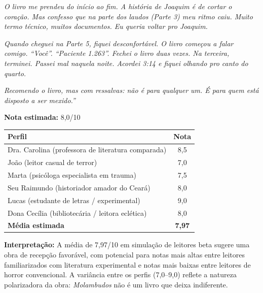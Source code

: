 \documentclass[14pt,openany]{extbook}
\newcommand{\ornamento}{\begin{center}\pgfornament[width=3.6cm,color=customgold]{85}\end{center}}
\begin{document}
\vspace{0.3em}
\noindent\textit{O livro me prendeu do início ao fim. A história de Joaquim é de cortar o coração. Mas confesso que na parte dos laudos (Parte 3) meu ritmo caiu. Muito termo técnico, muitos documentos. Eu queria voltar pro Joaquim.}

\vspace{0.3em}
\noindent\textit{Quando cheguei na Parte 5, fiquei desconfortável. O livro começou a falar comigo. ``Você''. ``Paciente 1.263''. Fechei o livro duas vezes. Na terceira, terminei. Passei mal naquela noite. Acordei 3:14 e fiquei olhando pro canto do quarto.}

\vspace{0.3em}
\noindent\textit{Recomendo o livro, mas com ressalvas: não é para qualquer um. É para quem está disposto a ser mexido.''}

\vspace{0.3em}
\noindent\textbf{Nota estimada:} 8,0/10

\vspace{0.8em}
\ornamento

\vspace{0.6em}

\begin{longtable}{>{\raggedright\arraybackslash}p{}c}
\toprule
\textbf{Perfil} & \textbf{Nota} \\
\midrule
\endhead
Dra. Carolina (professora de literatura comparada) & 8,5 \\
João (leitor casual de terror) & 7,0 \\
Marta (psicóloga especialista em trauma) & 7,5 \\
Seu Raimundo (historiador amador do Ceará) & 8,0 \\
Lucas (estudante de letras / experimental) & 9,0 \\
Dona Cecília (bibliotecária / leitora eclética) & 8,0 \\
\midrule
\textbf{Média estimada} & \textbf{7,97} \\
\bottomrule
\end{longtable}

\vspace{0.4em}
\noindent\textbf{Interpretação:} A média de 7,97/10 em simulação de leitores beta sugere uma obra de recepção favorável, com potencial para notas mais altas entre leitores familiarizados com literatura experimental e notas mais baixas entre leitores de horror convencional. A variância entre os perfis (7,0--9,0) reflete a natureza polarizadora da obra: \textit{Molambudos} não é um livro que deixa indiferente.
\end{document}
